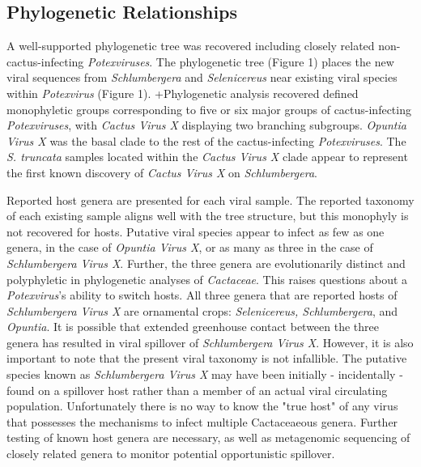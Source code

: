 \documentclass[11pt,letterpaper,titlepage]{article}
\begin{document}
\begin{linenumbers}
\subsection*{Phylogenetic Relationships}
A well-supported phylogenetic tree was recovered including closely related non-cactus-infecting \textit{Potexviruses}.
The phylogenetic tree (Figure 1) places the new viral sequences from \textit{Schlumbergera} and \textit{Selenicereus} near existing viral species within \textit{Potexvirus} (Figure 1). 
+Phylogenetic analysis recovered defined monophyletic groups corresponding to five or six major groups of cactus-infecting \textit{Potexviruses}, with \textit{Cactus Virus X} displaying two branching subgroups.
\textit{Opuntia Virus X} was the basal clade to the rest of the cactus-infecting \textit{Potexviruses}.
The \textit{S. truncata }samples located within the \textit{Cactus Virus X }clade appear to represent the first known discovery of \textit{Cactus Virus X} on \textit{Schlumbergera}.

Reported host genera are presented for each viral sample. 
The reported taxonomy of each existing sample aligns well with the tree structure, but this monophyly is not recovered for hosts.
Putative viral species appear to infect as few as one genera, in the case of \textit{Opuntia Virus X}, or as many as three in the case of \textit{Schlumbergera Virus X}.
Further, the three genera are evolutionarily distinct and polyphyletic in phylogenetic analyses of \textit{Cactaceae}. 
This raises questions about a \textit{Potexvirus}'s ability to switch hosts.
All three genera that are reported hosts of \textit{Schlumbergera Virus X} are ornamental crops: \textit{Selenicereus, Schlumbergera}, and \textit{Opuntia}.
It is possible that extended greenhouse contact between the three genera has resulted in viral spillover of \textit{Schlumbergera Virus X}.
However, it is also important to note that the present viral taxonomy is not infallible. 
The putative species known as \textit{Schlumbergera Virus X} may have been initially - incidentally - found on a spillover host rather than a member of an actual viral circulating population.
Unfortunately there is no way to know the "true host" of any virus that possesses the mechanisms to infect multiple Cactaceaeous genera. 
Further testing of known host genera are necessary, as well as metagenomic sequencing of closely related genera to monitor potential opportunistic spillover. 


\end{linenumbers}
\end{document}
